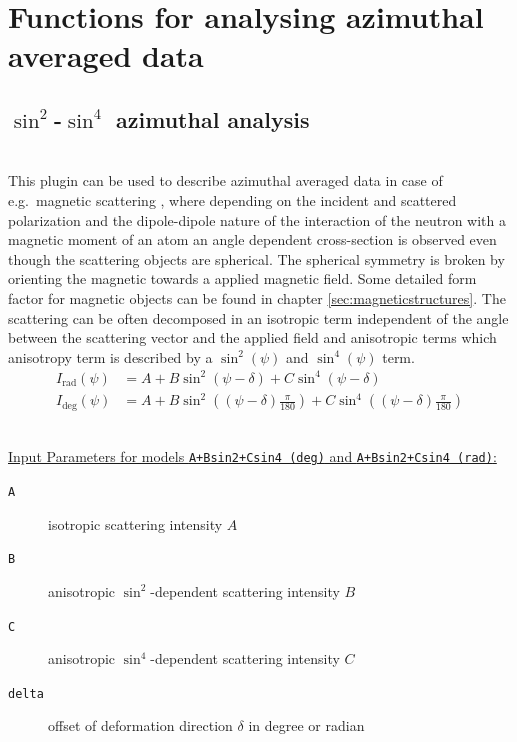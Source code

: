 \clearpage
\section{Functions for analysing azimuthal averaged data}



\subsection{$\sin^2$-$\sin^4$ azimuthal analysis} ~\\
This plugin can be used to describe azimuthal averaged data in case of e.g.\ magnetic scattering \cite{Wiedenmann2011}, where depending on the incident and scattered polarization and the dipole-dipole nature of the interaction of the neutron with a magnetic moment of an atom an angle dependent cross-section is observed even though the scattering objects are spherical. The spherical symmetry is broken by orienting the magnetic towards a applied magnetic field. Some detailed form factor for magnetic objects can be found in chapter \ref{sec:magneticstructures}. The scattering can be often decomposed in an isotropic term independent of the angle between the scattering vector and the applied field and anisotropic terms which anisotropy term is described by a $\sin^2(\psi)$ and $\sin^4(\psi)$ term.
\begin{align}
I_\mathrm{rad}(\psi) &= A + B\sin^2(\psi-\delta) + C \sin^4(\psi-\delta) \\
I_\mathrm{deg}(\psi) &= A + B\sin^2\left((\psi-\delta)\frac{\pi}{180}\right) + C \sin^4\left((\psi-\delta)\frac{\pi}{180}\right)
\end{align}

\hspace{1pt}\\
\underline{Input Parameters for models \texttt{A+Bsin2+Csin4 (deg)} and \texttt{A+Bsin2+Csin4 (rad)}:}\\
\begin{description}
\item[\texttt{A}] isotropic scattering intensity $A$
\item[\texttt{B}] anisotropic $\sin^2$-dependent scattering intensity $B$
\item[\texttt{C}] anisotropic $\sin^4$-dependent scattering intensity $C$
\item[\texttt{delta}] offset of deformation direction $\delta$ in degree or radian
\end{description}

